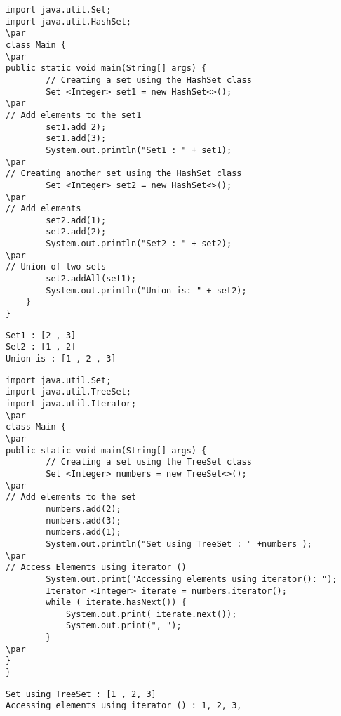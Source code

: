 \documentclass{book}
\def\lthtmlcheckvsize{\ifdim\ht\sizebox<\vsize 
  \ifdim\wd\sizebox<\hsize\expandafter\hfill\fi \expandafter\vfill
  \else\expandafter\vss\fi}%
\begin{document}
{\newpage\clearpage
{}%
\begin{lstlisting}
import java.util.Set;
import java.util.HashSet;
\par
class Main {
\par
public static void main(String[] args) {
		// Creating a set using the HashSet class
		Set <Integer> set1 = new HashSet<>();
\par
// Add elements to the set1
		set1.add 2);
		set1.add(3);
		System.out.println("Set1 : " + set1);
\par
// Creating another set using the HashSet class
		Set <Integer> set2 = new HashSet<>();
\par
// Add elements
		set2.add(1);
		set2.add(2);
		System.out.println("Set2 : " + set2);
\par
// Union of two sets
		set2.addAll(set1);
		System.out.println("Union is: " + set2);
	}
}
\end{lstlisting}%
\lthtmlfigureZ
\lthtmlcheckvsize\clearpage}

{\newpage\clearpage
{}%
\begin{lstlisting}
Set1 : [2 , 3]
Set2 : [1 , 2]
Union is : [1 , 2 , 3]
\end{lstlisting}%
\lthtmlfigureZ
\lthtmlcheckvsize\clearpage}

{\newpage\clearpage
{}%
\begin{lstlisting}
import java.util.Set;
import java.util.TreeSet;
import java.util.Iterator;
\par
class Main {
\par
public static void main(String[] args) {
		// Creating a set using the TreeSet class
		Set <Integer> numbers = new TreeSet<>();
\par
// Add elements to the set
		numbers.add(2);
		numbers.add(3);
		numbers.add(1);
		System.out.println("Set using TreeSet : " +numbers );
\par
// Access Elements using iterator ()
		System.out.print("Accessing elements using iterator(): ");
		Iterator <Integer> iterate = numbers.iterator();
		while ( iterate.hasNext()) {
			System.out.print( iterate.next());
			System.out.print(", ");
		}
\par
}
}
\end{lstlisting}%
\lthtmlfigureZ
\lthtmlcheckvsize\clearpage}

{\newpage\clearpage
{}%
\begin{lstlisting}
Set using TreeSet : [1 , 2, 3]
Accessing elements using iterator () : 1, 2, 3,
\end{lstlisting}%
\lthtmlfigureZ
\lthtmlcheckvsize\clearpage}
\end{document}
